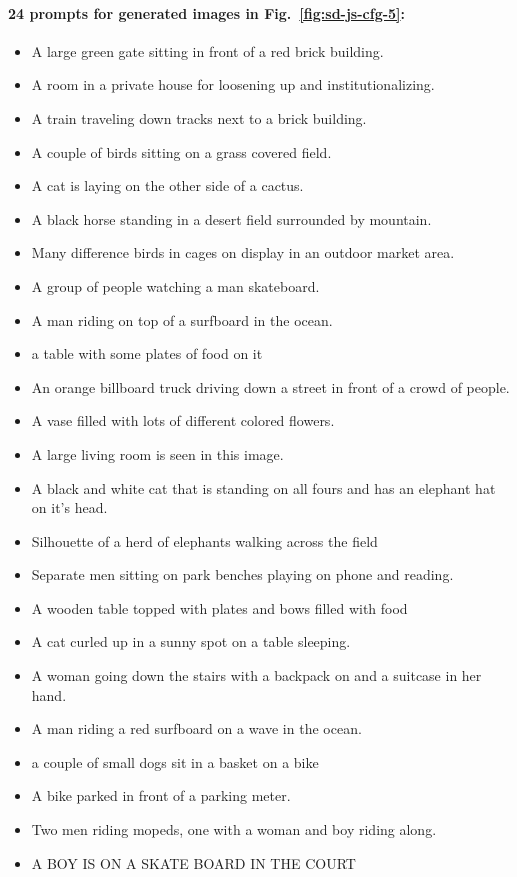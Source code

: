 \paragraph{24 prompts for generated images in Fig.~\ref{fig:sd-js-cfg-5}:}
\begin{itemize}
\item A large green gate sitting in front of a red brick building.
\item A room in a private house for loosening up and institutionalizing. 
\item A train traveling down tracks next to a brick building.
\item A couple of birds sitting on a grass covered field.
\item A cat is laying on the other side of a cactus.
\item A black horse standing in a desert field surrounded by mountain.
\item Many difference birds in cages on display in an outdoor market area.
\item A group of people watching a man skateboard.
\item A man riding on top of a surfboard in the ocean.
\item a table with some plates of food on it
\item An orange billboard truck driving down a street in front of a crowd of people.
\item A vase filled with lots of different colored flowers.
\item A large living room is seen in this image.
\item A black and white cat that is standing on all fours and has an elephant hat on it's head.
\item Silhouette of a herd of elephants walking across the field
\item Separate men sitting on park benches playing on phone and reading.
\item A wooden table topped with plates and bows filled with food
\item A cat curled up in a sunny spot on a table sleeping.
\item A woman going down the stairs with a backpack on and a suitcase in her hand. 
\item A man riding a red surfboard on a wave in the ocean.
\item a couple of small dogs sit in a basket on a bike
\item A bike parked in front of a parking meter.
\item Two men riding mopeds, one with a woman and boy riding along.
\item A BOY IS ON A SKATE BOARD IN THE COURT
\end{itemize}


